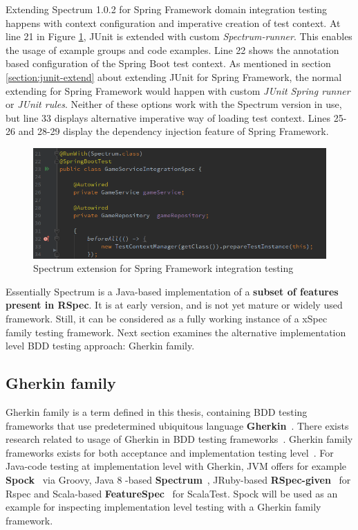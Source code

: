    Extending Spectrum 1.0.2 for Spring Framework domain integration testing happens with context configuration and imperative
    creation of test context. At line 21 in Figure \ref{fig:spectrum-init}, JUnit is extended with custom \textit{Spectrum-runner}.
    This enables the usage of example groups and code examples. Line 22 shows the annotation based configuration of the Spring Boot
    test context. As mentioned in section \ref{section:junit-extend} about extending JUnit for Spring Framework,
    the normal extending for Spring Framework would
    happen with custom \textit{JUnit Spring runner} or \textit{JUnit rules}. Neither of these options work with the Spectrum version in use,
    but line 33 displays alternative imperative way of loading test context. Lines 25-26 and 28-29 display the dependency
    injection feature of Spring Framework.

    \begin{figure}[ht]
      \begin{center}
        \includegraphics[width=13.7cm]{images/spectrum-init.png}
        \caption{Spectrum extension for Spring Framework integration testing}
        \label{fig:spectrum-init}
      \end{center}
    \end{figure}

    Essentially Spectrum is a Java-based implementation of a \textbf{subset of features present in RSpec}. It is at early version,
    and is not yet mature or widely used framework. Still, it can be considered as a fully working instance of a xSpec family
    testing framework. Next section examines the alternative implementation level BDD testing approach: Gherkin family.


    \subsection{Gherkin family}
    Gherkin family is a term defined in this thesis, containing BDD testing frameworks that use predetermined ubiquitous
    language \textbf{Gherkin}~\cite{gherkin}. There exists research related to usage of Gherkin in BDD testing frameworks~\cite{okolnychyi2016study}.
    Gherkin family frameworks exists for both acceptance and implementation testing level~\cite{okolnychyi2016study}. For Java-code testing at
    implementation level with Gherkin, JVM offers for example \textbf{Spock}~\cite{spock} via Groovy, Java 8 -based \textbf{Spectrum}~\cite{spectrum},
    JRuby-based \textbf{RSpec-given}~\cite{rspec-given} for Rspec and Scala-based \textbf{FeatureSpec}~\cite{featurespec} for ScalaTest.
    Spock will be used as an example for inspecting implementation level testing with a Gherkin family framework.

